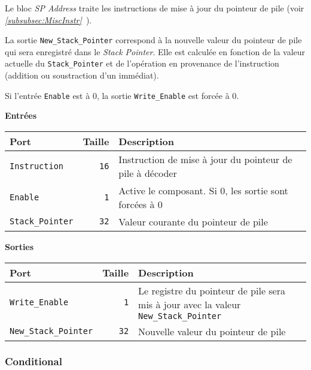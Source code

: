 
Le bloc \textit{SP Address} traite les instructions de mise à jour du pointeur de pile (voir \textit{\ref{subsubsec:MiscInstr}~}).

La sortie \texttt{New\_Stack\_Pointer} correspond à la nouvelle valeur du pointeur de pile qui sera enregistré dans le \textit{Stack Pointer}.
Elle est calculée en fonction de la valeur actuelle du \texttt{Stack\_Pointer} et de l'opération en provenance de l'instruction (addition ou soustraction d'un immédiat).

Si l'entrée \texttt{Enable} est à 0, la sortie \texttt{Write\_Enable} est forcée à 0.


\textbf{Entrées}\\

\begin{tabular}{|l|r|l|}
\hline
\textbf{Port}		& \textbf{Taille} & \textbf{Description}\\
\hline

\texttt{Instruction}	& \texttt{16} & Instruction de mise à jour du pointeur de pile à décoder\\
\hline
\texttt{Enable}		&  \texttt{1} & Active le composant. Si 0, les sortie sont forcées à 0\\
\hline
\texttt{Stack\_Pointer}	& \texttt{32} & Valeur courante du pointeur de pile\\

\hline
\end{tabular}

\vspace{1em}
\textbf{Sorties}\\

\begin{tabular}{|l|r|l|}
\hline 
\textbf{Port} & \textbf{Taille} & \textbf{Description}\\
\hline

\hline
\texttt{Write\_Enable}		&  \texttt{1} & Le registre du pointeur de pile sera mis à jour avec la valeur \texttt{New\_Stack\_Pointer}\\
\hline
\texttt{New\_Stack\_Pointer}	& \texttt{32} & Nouvelle valeur du pointeur de pile\\

\hline
\end{tabular}




\subsubsection{Conditional}

